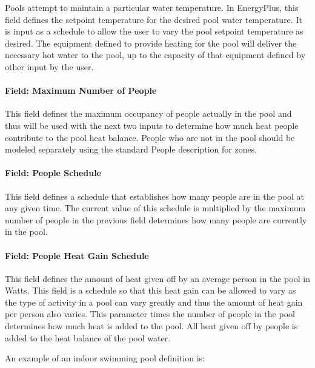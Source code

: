 Pools attempt to maintain a particular water temperature. In EnergyPlus, this field defines the setpoint temperature for the desired pool water temperature. It is input as a schedule to allow the user to vary the pool setpoint temperature as desired. The equipment defined to provide heating for the pool will deliver the necessary hot water to the pool, up to the capacity of that equipment defined by other input by the user.

\paragraph{Field: Maximum Number of People}\label{field-maximum-number-of-people}

This field defines the maximum occupancy of people actually in the pool and thus will be used with the next two inputs to determine how much heat people contribute to the pool heat balance. People who are not in the pool should be modeled separately using the standard People description for zones.

\paragraph{Field: People Schedule}\label{field-people-schedule}

This field defines a schedule that establishes how many people are in the pool at any given time. The current value of this schedule is multiplied by the maximum number of people in the previous field determines how many people are currently in the pool.

\paragraph{Field: People Heat Gain Schedule}\label{field-people-heat-gain-schedule}

This field defines the amount of heat given off by an average person in the pool in Watts. This field is a schedule so that this heat gain can be allowed to vary as the type of activity in a pool can vary greatly and thus the amount of heat gain per person also varies. This parameter times the number of people in the pool determines how much heat is added to the pool. All heat given off by people is added to the heat balance of the pool water.

An example of an indoor swimming pool definition is:

